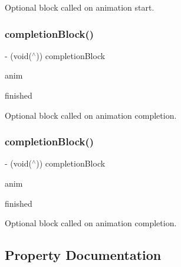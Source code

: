 Optional block called on animation start. \mbox{\label{interface_p_o_p_animation_ab6461bce27fd84fc22f86a4560d2273f}} 
\subsubsection{\texorpdfstring{completion\+Block()}{completionBlock()}\hspace{0.1cm}{\footnotesize\ttfamily [1/2]}}
{\footnotesize\ttfamily -\/ (void($^\wedge$)) completion\+Block \begin{DoxyParamCaption}\item[{(\mbox{\hyperlink{interface_p_o_p_animation}{P\+O\+P\+Animation}} $\ast$)}]{anim }\item[{(B\+O\+OL)}]{finished }\end{DoxyParamCaption}}

Optional block called on animation completion. \mbox{\label{interface_p_o_p_animation_ab6461bce27fd84fc22f86a4560d2273f}} 
\subsubsection{\texorpdfstring{completion\+Block()}{completionBlock()}\hspace{0.1cm}{\footnotesize\ttfamily [2/2]}}
{\footnotesize\ttfamily -\/ (void($^\wedge$)) completion\+Block \begin{DoxyParamCaption}\item[{(\mbox{\hyperlink{interface_p_o_p_animation}{P\+O\+P\+Animation}} $\ast$)}]{anim }\item[{(B\+O\+OL)}]{finished }\end{DoxyParamCaption}}

Optional block called on animation completion. 

\subsection{Property Documentation}
\mbox{\label{interface_p_o_p_animation_ae7793f881ec2a41ed014a443154603fc}} 
